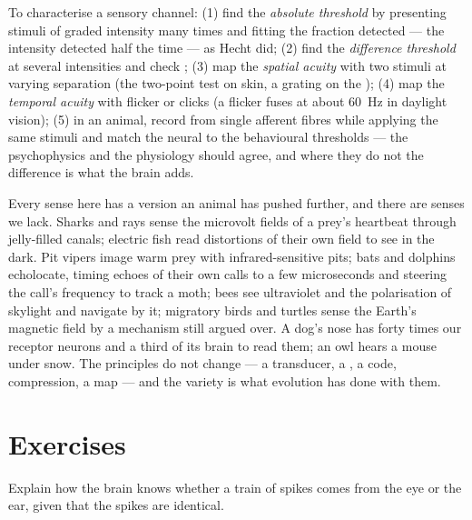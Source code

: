 \begin{method}\label{met:b3:sensory-systems:psychophysics}
To characterise a sensory channel: (1) find the \emph{absolute
threshold} by presenting stimuli of graded intensity many times and
fitting the fraction detected --- the intensity detected half the time
--- as Hecht did; (2) find the \emph{difference threshold} at several
intensities and check ; (3) map the \emph{spatial acuity} with
two stimuli at varying separation (the two-point test on skin, a
grating on the ); (4) map the \emph{temporal acuity} with flicker
or clicks (a flicker fuses at about \qty{60}{Hz} in daylight vision);
(5) in an animal, record from single afferent fibres while applying
the same stimuli and match the neural to the behavioural thresholds
--- the psychophysics and the physiology should agree, and where they
do not the difference is what the brain adds.
\end{method}

\begin{remark}\label{rem:b3:sensory-systems:others}
Every sense here has a version an animal has pushed further, and there
are senses we lack. Sharks and rays sense the microvolt fields of a
prey's heartbeat through jelly-filled canals; electric fish read
distortions of their own field to see in the dark. Pit vipers image
warm prey with infrared-sensitive pits; bats and dolphins echolocate,
timing echoes of their own calls to a few microseconds and steering the
call's frequency to track a moth; bees see ultraviolet and the
polarisation of skylight and navigate by it; migratory birds and
turtles sense the Earth's magnetic field by a mechanism still argued
over. A dog's nose has forty times our receptor neurons and a third
of its brain to read them; an owl hears a mouse under snow. The
principles do not change --- a transducer, a , a code,
compression, a map --- and the variety is what evolution has done with
them.
\end{remark}

\section{Exercises}

\begin{exercise}[$\star$]\label{exo:b3:sensory-systems:1}
Explain how the brain knows whether a train of spikes comes from the
eye or the ear, given that the spikes are identical.
\end{exercise}

